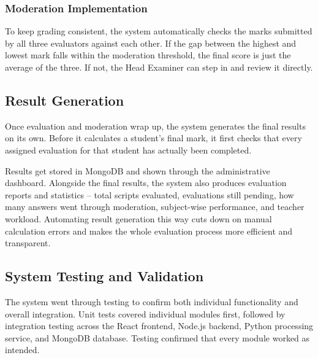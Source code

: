 \subsubsection{Moderation Implementation}

To keep grading consistent, the system automatically checks the marks submitted by all three evaluators against each other. If the gap between the highest and lowest mark falls within the moderation threshold, the final score is just the average of the three. If not, the Head Examiner can step in and review it directly.

\subsection{Result Generation}

Once evaluation and moderation wrap up, the system generates the final results on its own. Before it calculates a student's final mark, it first checks that every assigned evaluation for that student has actually been completed.

Results get stored in MongoDB and shown through the administrative dashboard. Alongside the final results, the system also produces evaluation reports and statistics -- total scripts evaluated, evaluations still pending, how many answers went through moderation, subject-wise performance, and teacher workload. Automating result generation this way cuts down on manual calculation errors and makes the whole evaluation process more efficient and transparent.

\subsection{System Testing and Validation}

The system went through testing to confirm both individual functionality and overall integration. Unit tests covered individual modules first, followed by integration testing across the React frontend, Node.js backend, Python processing service, and MongoDB database. Testing confirmed that every module worked as intended.

